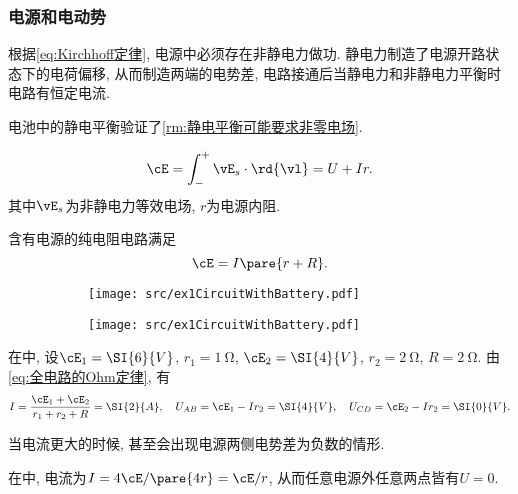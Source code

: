\documentclass[../Electromagnetism.tex]{subfiles}
\begin{document}

\subsubsection{电源和电动势} %
\label{ssub:电源和电动势}

根据\eqref{eq:Kirchhoff定律}, 电源中必须存在非静电力做功. 静电力制造了电源开路状态下的电荷偏移, 从而制造两端的电势差, 电路接通后当静电力和非静电力平衡时电路有恒定电流.
\begin{remark}
	电池中的静电平衡验证了\cref{rm:静电平衡可能要求非零电场}.
\end{remark}
\begin{finale}
	\begin{corollary}[含电源电路的Ohm定律]\quad
		\[ \cE = \int_-^+ \vE_s\cdot\rd{\vl} = U + Ir. \]
		其中$\vE_s$为非静电力等效电场, $r$为电源内阻.
	\end{corollary}
\end{finale}
\begin{corollary}[全电路的Ohm定律]
	含有电源的纯电阻电路满足
	\begin{equation}
		\label{eq:全电路的Ohm定律}
		\cE = I\pare{r+R}.
	\end{equation}
\end{corollary}
\begin{figure}
	\centering
	\begin{subfigure}{.45\textwidth}
		\centering
			\texttt{[image: src/ex1CircuitWithBattery.pdf]}
		\caption{}
		\label{fig:含电源电路示例1}
	\end{subfigure}
	\begin{subfigure}{.45\textwidth}
		\centering
			\texttt{[image: src/ex1CircuitWithBattery.pdf]}
		\caption{}
		\label{fig:纯电源电路示例1}
	\end{subfigure}
\end{figure}
\begin{ex}
	在中, 设$\cE_1 = \SI{6}{V}$, $r_1 = \SI{1}{\ohm}$, $\cE_2 = \SI{4}{V}$, $r_2 = \SI{2}{\ohm}$, $R = \SI{2}{\ohm}$. 由\eqref{eq:全电路的Ohm定律}, 有
	\[ I = \frac{\cE_1 + \cE_2}{r_1 + r_2 + R} = \SI{2}{A},\quad U_{AB} = \cE_1 - Ir_2 = \SI{4}{V},\quad U_{CD} = \cE_2 - Ir_2 = \SI{0}{V}. \]
\end{ex}
\begin{remark}
	当电流更大的时候, 甚至会出现电源两侧电势差为负数的情形.
\end{remark}
\begin{ex}
	在中, 电流为$I = 4\cE/\pare{4r} = \cE/r$, 从而任意电源外任意两点皆有$U = 0$.
\end{ex}
\end{document}
